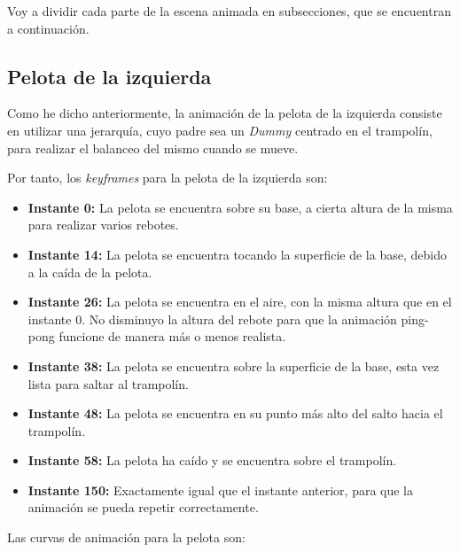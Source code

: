 \bigskip


Voy a dividir cada parte de la escena animada en subsecciones, que se encuentran a continuación.

\newpage

\subsection{Pelota de la izquierda}
Como he dicho anteriormente, la animación de la pelota de la izquierda consiste en utilizar una jerarquía, cuyo padre sea un \textit{Dummy} centrado en el trampolín, para realizar el balanceo del mismo cuando se mueve.

\bigskip

Por tanto, los \textit{keyframes} para la pelota de la izquierda son:

\begin{itemize}
    \item \textbf{Instante 0: }La pelota se encuentra sobre su base, a cierta altura de la misma para realizar varios rebotes.
    \item \textbf{Instante 14: }La pelota se encuentra tocando la superficie de la base, debido a la caída de la pelota.
    \item \textbf{Instante 26: }La pelota se encuentra en el aire, con la misma altura que en el instante 0. No disminuyo la altura del rebote para que la animación ping-pong funcione de manera más o menos realista.
    \item \textbf{Instante 38: }La pelota se encuentra sobre la superficie de la base, esta vez lista para saltar al trampolín.
    \item \textbf{Instante 48: }La pelota se encuentra en su punto más alto del salto hacia el trampolín.
    \item \textbf{Instante 58: }La pelota ha caído y se encuentra sobre el trampolín.
    \item \textbf{Instante 150: }Exactamente igual que el instante anterior, para que la animación se pueda repetir correctamente.
\end{itemize}

\bigskip

Las curvas de animación para la pelota son:

